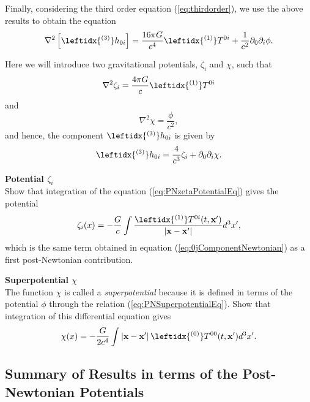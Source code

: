 Finally, considering the third order equation (\ref{eq:thirdorder}), we use the above results to obtain the equation
\begin{equation}
\nabla^2 \left[ \leftidx{^{(3)}} h_{0i} \right] =  \frac{16\pi G}{c^4}  \leftidx{^{(1)}}T^{0i} + \frac{1}{c^2} \partial_0 \partial_i \phi .
\end{equation}

Here we will introduce two gravitational potentials, $\zeta_i$ and $\chi$, such that
\begin{equation}
\nabla^2 \zeta_i = \frac{4\pi G}{c}  \leftidx{^{(1)}}T^{0i} \label{eq:PNzetaPotentialEq}
\end{equation}
and 
\begin{equation}
\nabla^2 \chi = \frac{\phi}{c^2}, \label{eq:PNSuperpotentialEq}
\end{equation}
and hence, the component $\leftidx{^{(3)}} h_{0i}$ is given by
\begin{equation}
\leftidx{^{(3)}} h_{0i} = \frac{4}{c^3} \zeta_i + \partial_0 \partial_i \chi .
\end{equation}

\begin{exercise}
\textbf{Potential $\zeta_i$}\\
Show that integration of the equation (\ref{eq:PNzetaPotentialEq}) gives the potential
\begin{equation}
\zeta_i (x)= - \frac{G}{c} \int \frac{\leftidx{^{(1)}}T^{0i}(t, \textbf{x}') }{\left|  \textbf{x} - \textbf{x}' \right|} d^3 x' ,
\end{equation}
which is the same term obtained in equation (\ref{eq:0jComponentNewtonian}) as a first post-Newtonian contribution. 
\end{exercise}

\begin{exercise}[Superpotential]
\textbf{Superpotential $\chi$}\\
The function $\chi$ is called a \textit{superpotential} because it is defined in terms of the potential $\phi$ through the relation (\ref{eq:PNSuperpotentialEq}). Show that integration of this differential equation gives
\begin{equation}
\chi (x)= -\frac{G}{2c^4} \int \left|  \textbf{x} - \textbf{x}' \right| \leftidx{^{(0)}}T^{00} (t,  \textbf{x}') d^3 x' .
\end{equation}
\end{exercise}


\subsection{Summary of Results in terms of the Post-Newtonian Potentials}

